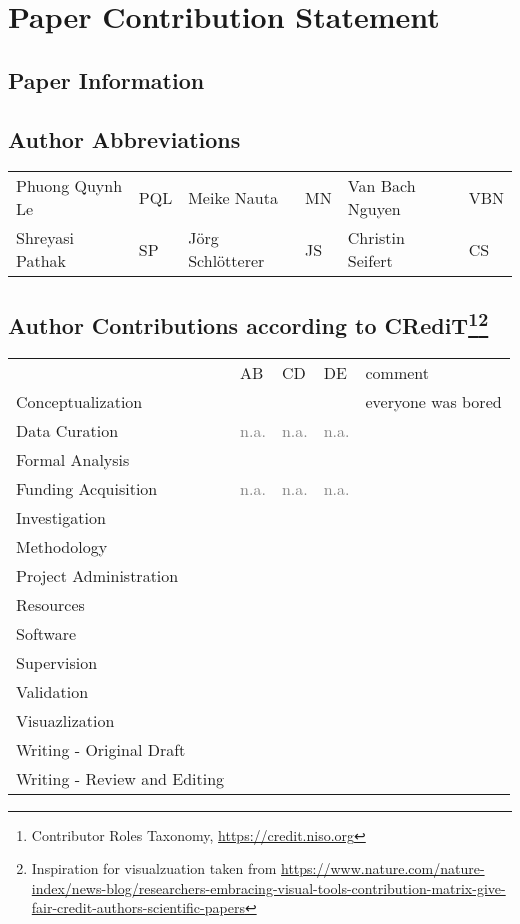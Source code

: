 \documentclass{article}
\newcommand{\low}[0]{\cellcolor{black!25}~}
\newcommand{\medium}[0]{\cellcolor{black!50}~}
\newcommand{\high}[0]{\cellcolor{black!75}~}
\newcommand{\sole}[0]{\cellcolor{black}~}
\newcommand{\na}[0]{\textcolor{gray}{n.a.}}
\begin{document}
\section*{Paper Contribution Statement}

\subsection*{Paper Information}

\subsection*{Author Abbreviations}
\begin{tabular}{llllll}
Phuong Quynh Le     & PQL &
Meike Nauta         & MN  &
Van Bach Nguyen     & VBN \\
Shreyasi Pathak     & SP  &
Jörg Schlötterer    & JS  &
Christin Seifert    & CS \\
\end{tabular}


\subsection*{Author Contributions according to CRediT\footnote{Contributor Roles Taxonomy, \url{https://credit.niso.org}}\footnote{Inspiration for visualzuation taken from \url{https://www.nature.com/nature-index/news-blog/researchers-embracing-visual-tools-contribution-matrix-give-fair-credit-authors-scientific-papers}}}

\begin{tabular}{llllp{4cm}}
 & AB & CD & DE  & comment \\
Conceptualization 
    & \low 
    & \low 
    & \medium
    & everyone was bored\\
Data Curation
    & \na
    & \na
    & \na\\
Formal Analysis
    & \sole
    & 
    & \\
Funding Acquisition
    & \na
    & \na
    & \na\\
Investigation
    & \sole
    & 
    & \\
Methodology
    & 
    & \medium
    & \medium\\
Project Administration
    & 
    & \sole
    & \\
Resources
    & \sole
    & 
    & \\
Software 
    & \sole
    & 
    & \\
Supervision
    & 
    & 
    & \sole\\
Validation
    & \sole
    & 
    & \\
Visuazlization
    & 
    & \high
    & \low\\
Writing - Original Draft
    & \sole
    & 
    & \\
Writing - Review and Editing
    & \low
    & \low
    & \medium \\
\end{tabular}
\end{document}
